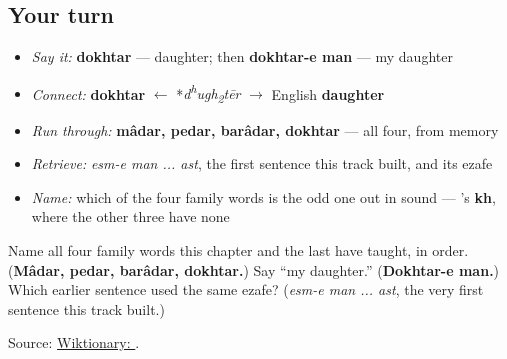 \subsection*{Your turn}
\begin{itemize}
\raggedright
  \item \emph{Say it:} \textbf{dokhtar} — daughter; then \textbf{dokhtar-e man} — my daughter
  \item \emph{Connect:} \textbf{dokhtar} $\leftarrow$ *\emph{d\textsuperscript{h}ugh\textsubscript{2}tēr} $\to$ English \textbf{daughter}
  \item \emph{Run through:} \textbf{mâdar, pedar, barâdar, dokhtar} — all four, from memory
  \item \emph{Retrieve:} \emph{esm-e man ... ast}, the first sentence this track built, and its ezafe
  \item \emph{Name:} which of the four family words is the odd one out in sound — \textbf{}'s \textbf{kh}, where the other three have none
\end{itemize}

\begin{tcolorbox}[breakable,colback=teal!4,colframe=teal!35!black,title={Before you move on}]
Name all four family words this chapter and the last have taught, in order. (\textbf{Mâdar, pedar, barâdar, dokhtar.}) Say “my daughter.” (\textbf{Dokhtar-e man.}) Which earlier sentence used the same ezafe? (\emph{esm-e man ... ast}, the very first sentence this track built.)

Source: \href{https://en.wiktionary.org/wiki/\%D8\%AF\%D8\%AE\%D8\%AA\%D8\%B1}{Wiktionary: }.
\end{tcolorbox}
